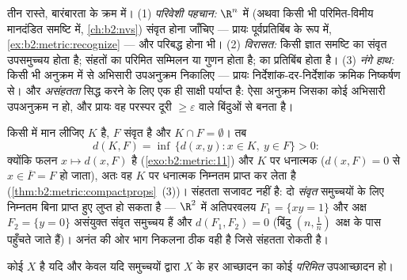 \begin{method}[किसी समुच्चय के संहत होने को सिद्ध करना]\label{met:b2:metric:compactness}
तीन रास्ते, बारंबारता के क्रम में। (1) \emph{परिवेशी पहचान:} $\R^n$ में
(अथवा किसी भी परिमित-विमीय मानदंडित समष्टि में, \cref{ch:b2:nvs}) संवृत होना जाँचिए
--- प्रायः पूर्वप्रतिबिंब के रूप में, \cref{ex:b2:metric:recognize} --- और परिबद्ध होना भी। (2)
\emph{विरासत:} किसी ज्ञात  समष्टि का संवृत उपसमुच्चय  होता है;
संहतों का परिमित सम्मिलन या गुणन  होता है;  का  प्रतिबिंब
 होता है। (3) \emph{नंगे हाथ:} किसी भी अनुक्रम में से अभिसारी
उपअनुक्रम निकालिए --- प्रायः निर्देशांक-दर-निर्देशांक क्रमिक निष्कर्षण
से। और \emph{असंहतता} सिद्ध करने के लिए एक ही साक्षी पर्याप्त है: ऐसा
अनुक्रम जिसका कोई अभिसारी उपअनुक्रम न हो, और प्रायः वह परस्पर दूरी $\geq \varepsilon$
वाले बिंदुओं से बनता है।
\end{method}

\begin{example}\label{ex:b2:metric:setdistance}
किसी  में मान लीजिए $K$  है, $F$ संवृत है और $K \cap F = \emptyset$। तब
\[
d(K, F) = \inf\,\{d(x, y) : x \in K,\ y \in F\} > 0 :
\]
क्योंकि फलन $x \mapsto d(x, F)$  है (\cref{exo:b2:metric:11}) और $K$ पर धनात्मक ($d(x, F) = 0$ से $x \in \overline F = F$ हो जाता),
अतः वह  $K$ पर धनात्मक निम्नतम प्राप्त कर लेता है (\cref{thm:b2:metric:compactprops}~(3))।
संहतता सजावट नहीं है: दो \emph{संवृत} समुच्चयों के लिए निम्नतम बिना
प्राप्त हुए लुप्त हो सकता है --- $\R^2$ में अतिपरवलय $F_1 = \{xy
= 1\}$ और अक्ष $F_2 = \{y = 0\}$
असंयुक्त संवृत समुच्चय हैं और $d(F_1, F_2) = 0$ (बिंदु $(n, \frac1n)$ अक्ष के पास पहुँचते
जाते हैं)। अनंत की ओर भाग निकलना ठीक वही है जिसे संहतता रोकती है।
\end{example}

\begin{theorem}[बोरेल--लेबेग]\label{thm:b2:metric:borellebesgue}
कोई  $X$  है यदि और केवल यदि  समुच्चयों द्वारा $X$
के हर आच्छादन का कोई \emph{परिमित} उपआच्छादन हो।
\end{theorem}

